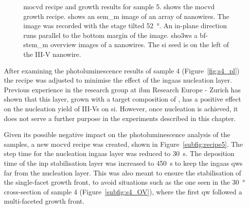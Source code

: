 \begin{figure}
{
    }
    \caption{\acs{mocvd} recipe and growth results for sample 5.  shows the \acs{mocvd} growth recipe.  shows an \acs{sem_m} image of an array of nanowires. The image was recorded with the stage tilted \qty{52}{\degree}. An in-plane  direction runs parallel to the bottom margin of the image.  sho3ws a \acs{bf}-\acs{stem_m} overview images of a nanowires. The \acs{si} seed is on the left of the III-V nanowire.}
    \label{fig:s5_recipe_microscopy}
\end{figure}

After examining the photoluminescence results of sample 4 (Figure~\ref{fig:s4_pl}) the recipe was adjusted to minimise the effect of the \acs{ingaas} nucleation layer. Previous experience in the research group at \acs{ibm} Research Europe - Zurich has shown that this layer, grown with a target composition of , has a positive effect on the nucleation yield of III-Vs on \acs{si}. However, once nucleation is achieved, it does not serve a further purpose in the experiments described in this chapter. 

Given its possible negative impact on the photoluminescence analysis of the samples, a new \acf{mocvd} recipe was created, shown in Figure~\ref{subfig:recipe5}. The step time for the nucleation \acs{ingaas} layer was reduced to \qty{30}{\second}. The deposition time of the \acs{inp} stabilisation layer was increased to \qty{450}{\second} to keep the \acs{ingaas} \acl{qw}s far from the nucleation layer. This was also meant to ensure the stabilisation of the single-facet  growth front, to avoid situations such as the one seen in the \qty{30}{\degree} cross-section of sample 4 (Figure~\ref{subfig:s4_OV}), where the first \acl{qw} followed a multi-faceted growth front. 

